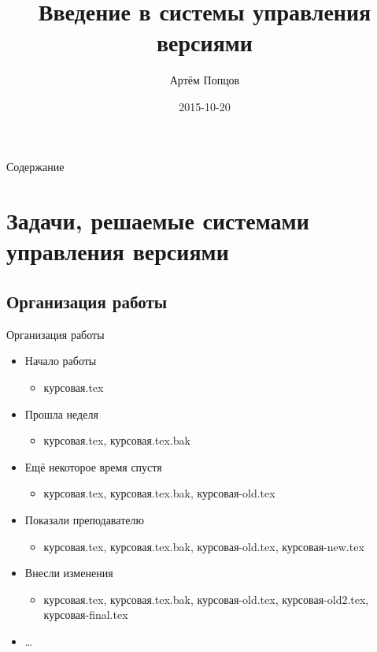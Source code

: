 \documentclass[presentation]{beamer}
\author{Артём Попцов}
\date{2015-10-20}
\title{Введение в системы управления версиями}
\begin{document}
\maketitle



\begin{frame}{Содержание}
  \setcounter{tocdepth}{1}
  \tableofcontents
\end{frame}



\section{Задачи, решаемые системами управления версиями}

\subsection{Организация работы}

\begin{frame}{Организация работы}
  \begin{itemize}
  \item Начало работы
    \begin{itemize}
    \item курсовая.tex
    \end{itemize}
  \item Прошла неделя
    \begin{itemize}
    \item курсовая.tex, курсовая.tex.bak
    \end{itemize}
  \item Ещё некоторое время спустя
    \begin{itemize}
    \item курсовая.tex, курсовая.tex.bak, курсовая-old.tex
    \end{itemize}
  \item Показали преподавателю
    \begin{itemize}
    \item курсовая.tex, курсовая.tex.bak, курсовая-old.tex,
      курсовая-new.tex
    \end{itemize}
  \item Внесли изменения
    \begin{itemize}
    \item курсовая.tex, курсовая.tex.bak, курсовая-old.tex,
      курсовая-old2.tex, курсовая-final.tex
    \end{itemize}
  \item \ldots{}
  \end{itemize}
\end{frame}
\end{document}
